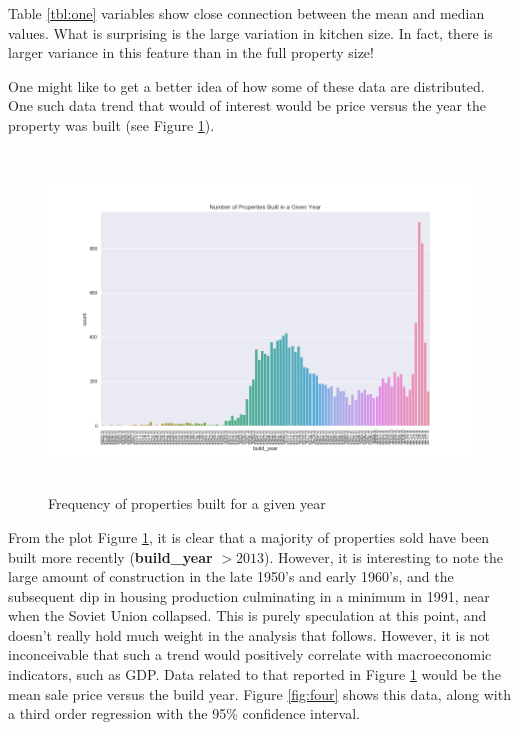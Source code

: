 \documentclass[12pt]{article}
\theoremstyle{plain} %
\theoremstyle{definition} %
\theoremstyle{remark} %
\begin{document}
Table \ref{tbl:one} variables show close connection between the mean and median values.  What is surprising is the large variation in kitchen size.  In fact, there is larger variance in this feature than in the full property size!

One might like to get a better idea of how some of these data are distributed.  One such data trend that would of interest would be price versus the year the property was built (see Figure \ref{fig:three}).

\begin{figure}[h!]
\begin{center}
\includegraphics[width=18cm,height=9cm]{./output_images/properties_year.png}
\caption{Frequency of properties built for a given year}
\label{fig:three}
\end{center}
\end{figure}

From the plot Figure \ref{fig:three}, it is clear that a majority of properties sold have been built more recently (\textbf{build\_year} $> 2013$).  However, it is interesting to note the large amount of construction in the late 1950's and early 1960's, and the subsequent dip in housing production culminating in a minimum in 1991, near when the Soviet Union collapsed.  This is purely speculation at this point, and doesn't really hold much weight in the analysis that follows.  However, it is not inconceivable that such a trend would positively correlate with macroeconomic indicators, such as GDP.  Data related to that reported in Figure \ref{fig:three} would be the mean sale price versus the build year.  Figure \ref{fig:four} shows this data, along with a third order regression with the 95\% confidence interval. 
\end{document}
